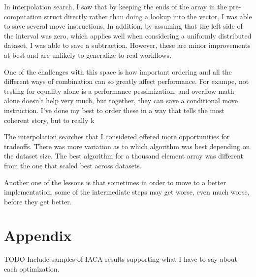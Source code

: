 \documentclass[twocolumn]{article}
\begin{document}
In interpolation search, I saw that by keeping the ends of the array in the pre-computation struct directly rather than doing a lookup into the vector, I was able to save several move instructions. In addition, by assuming that the left side of the interval was zero, which applies well when considering a uniformly distributed dataset, I was able to save a subtraction. However, these are minor improvements at best and are unlikely to generalize to real workflows.

One of the challenges with this space is how important ordering and all the different ways of combination can so greatly affect performance. For exampe, not testing for equality alone is a performance pessimization, and overflow math alone doesn't help very much, but together, they can save a conditional move instruction. I've done my best to order these in a way that tells the most coherent story, but to really k

The interpolation searches that I considered offered more opportunities for tradeoffs. There was more variation as to which algorithm was best depending on the dataset size. The best algorithm for a thousand element array was different from the one that scaled best across datasets. 

Another one of the lessons is that sometimes in order to move to a better implementation, some of the intermediate steps may get worse, even much worse, before they get better.

\section{Appendix}
TODO Include samples of IACA results supporting what I have to say about each optimization.
\end{document}

